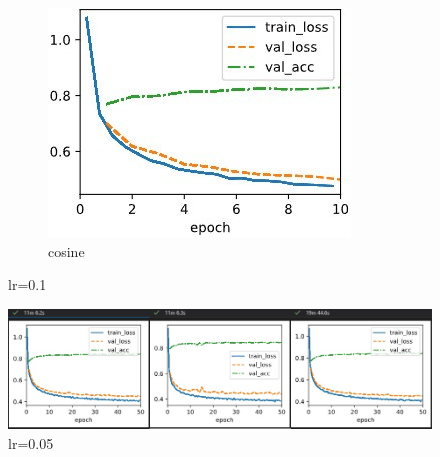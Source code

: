 \documentclass{article}
\begin{document}
\begin{figure}
\begin{subfigure}[b]{0.3\columnwidth}
      \includegraphics[width=\columnwidth]{img/lr0.1 cosine.jpg}
      \caption{cosine}
   \end{subfigure}
\caption{lr=0.1}
\label{lr:0.1}
\end{figure}

\begin{figure}
   \includegraphics[width=\columnwidth]{img/lr0.05 m0.03.jpg}
\caption{lr=0.05}
\label{lr:0.05}
\end{figure}
\end{document}
